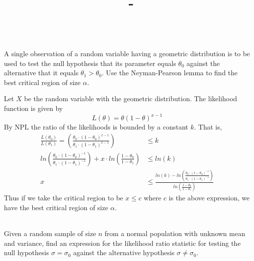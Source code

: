 \documentclass[answers,12pt,addpoints]{exam}
\author{\name}
\title{\course \ - \assignment}
\begin{document}
\maketitle


\newpage
\begin{questions}
    \\
    A single observation of a random variable having a geometric distribution is to be used
    to test the null hypothesis that its parameter equals \(\theta_0\) against the alternative that it
    equals \(\theta_1 > \theta_0\). Use the Neyman-Pearson lemma to find the best critical region of size \(\alpha\).
    \begin{solution}
        Let \(X\) be the random variable with the geometric distribution. The likelihood function is given by
        \[L(\theta) = \theta(1-\theta)^{x-1}\]
        By NPL the ratio of the likelihoods is bounded by a constant \(k\). That is,
        \begin{align*}
            \frac{L(\theta_0)}{L(\theta_1)} = \left(\frac{\theta_0 \cdot (1-\theta_0)^{x-1}}{\theta_1 \cdot (1-\theta_1)^{x-1}}\right) &\leq k\\
            ln\left(\frac{\theta_0 \cdot (1-\theta_0)^{-1}}{\theta_1 \cdot (1-\theta_1)^{-1}}\right) + x \cdot ln\left(\frac{1-\theta_0}{1-\theta_1}\right) &\leq ln(k)\\
            x &\leq \frac{ln(k) - ln\left(\frac{\theta_0 \cdot (1-\theta_0)^{-1}}{\theta_1 \cdot (1-\theta_1)^{-1}}\right)}{ln\left(\frac{1-\theta_0}{1-\theta_1}\right)}
        \end{align*}
        Thus if we take the critical region to be \(x \leq c\) where \(c\) is the above expression, we have the best critical region of size \(\alpha\).
    \end{solution}

    \\
    Given a random sample of size \(n\) from a normal population with unknown mean and
    variance, find an expression for the likelihood ratio statistic for testing the null hypothesis
    \(\sigma = \sigma_0\) against the alternative hypothesis \(\sigma \neq \sigma_0\).


\end{questions}
\end{document}

